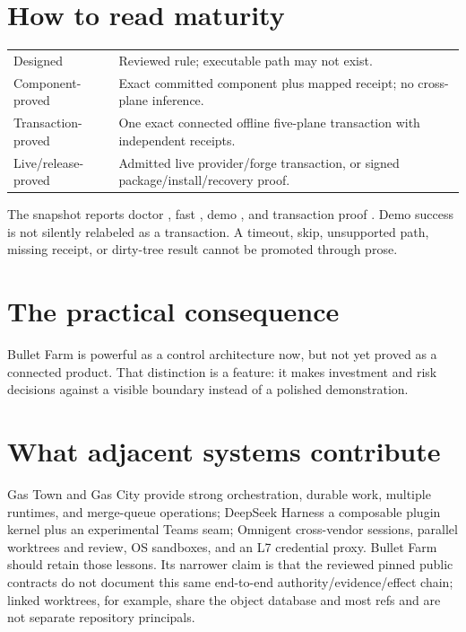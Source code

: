 \documentclass[11pt,letterpaper]{article}
\begin{document}
\section*{How to read maturity}

\begin{tabularx}{\textwidth}{@{}p{}X@{}}
\textsf{Designed} & Reviewed rule; executable path may not exist. \\
\textsf{Component-proved} & Exact committed component plus mapped receipt; no cross-plane inference. \\
\textsf{Transaction-proved} & One exact connected offline five-plane transaction with independent receipts. \\
\textsf{Live/release-proved} & Admitted live provider/forge transaction, or signed package/install/recovery proof. \\
\end{tabularx}

The snapshot reports doctor \EvidenceDoctorOutcome, fast
\EvidenceFastOutcome, demo \EvidenceDemoOutcome, and transaction proof
\EvidenceTransactionOutcome. Demo success is not silently relabeled as a
transaction. A timeout, skip, unsupported path, missing receipt, or dirty-tree
result cannot be promoted through prose.

\section*{The practical consequence}

Bullet Farm is powerful as a control architecture now, but not yet proved as a
connected product. That distinction is a feature: it makes investment and risk
decisions against a visible boundary instead of a polished demonstration.

\newpage
\section*{What adjacent systems contribute}

Gas Town and Gas City provide strong orchestration, durable work, multiple
runtimes, and merge-queue operations; DeepSeek Harness a composable plugin
kernel plus an experimental Teams seam; Omnigent cross-vendor sessions,
parallel worktrees and review, OS sandboxes, and an L7 credential proxy.
Bullet Farm should retain those lessons. Its narrower claim is that the
reviewed pinned public contracts do not document this same end-to-end
authority/evidence/effect chain; linked worktrees, for example, share the
object database and most refs and are not separate repository principals.
\end{document}
